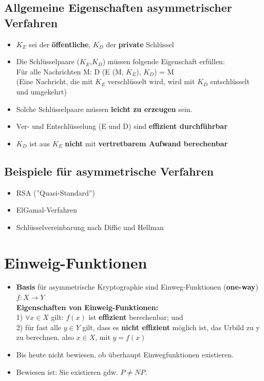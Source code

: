 \documentclass[openany]{book}
\begin{document}
\subsection{Allgemeine Eigenschaften asymmetrischer Verfahren}

\begin{itemize}
    \item $K_E$ sei der \textbf{öffentliche}, $K_D$ der \textbf{private} Schlüssel
    \item Die Schlüsselpaare ($K_E$,$K_D$) müssen folgende Eigenschaft erfüllen:\\ Für alle Nachrichten M: D (E (M, $K_E$), $K_D$) = M \\ (Eine Nachricht, die mit $K_E$ verschlüsselt wird, wird mit $K_D$ entschlüsselt und umgekehrt)
    \item Solche Schlüsselpaare müssen \textbf{leicht zu erzeugen} sein.
    \item Ver- und Entschlüsselung (E und D) sind \textbf{effizient durchführbar}
    \item $K_D$ ist aus $K_E$ \textbf{nicht} mit \textbf{vertretbarem Aufwand berechenbar}
\end{itemize}

\subsection{Beispiele für asymmetrische Verfahren}

\begin{itemize}
    \item RSA (''Quasi-Standard'')
    \item ElGamal-Verfahren
    \item Schlüsselvereinbarung nach Diffie und Hellman
\end{itemize}

\section{Einweig-Funktionen}

\begin{itemize}
    \item \textbf{Basis} für asymmetrische Kryptographie sind Einweg-Funktionen (\textbf{one-way}) \\ $f:X\rightarrow Y$ \\ \textbf{Eigenschaften von Einweig-Funktionen:} \\ 1) $\forall x\in X$ gilt: $f(x)$ ist \textbf{effizient} berechenbar; und \\ 2) für fast alle $y\in Y$ gilt, dass es \textbf{nicht effizient} möglich ist, das Urbild zu y zu berechnen, also $x\in X$, mit $y=f(x)$
    \item Bis heute nicht bewiesen, ob überhaupt Einwegfunktionen existieren.
    \item Bewiesen ist: Sie existieren gdw. $P\neq NP$.
\end{itemize}
\end{document}
